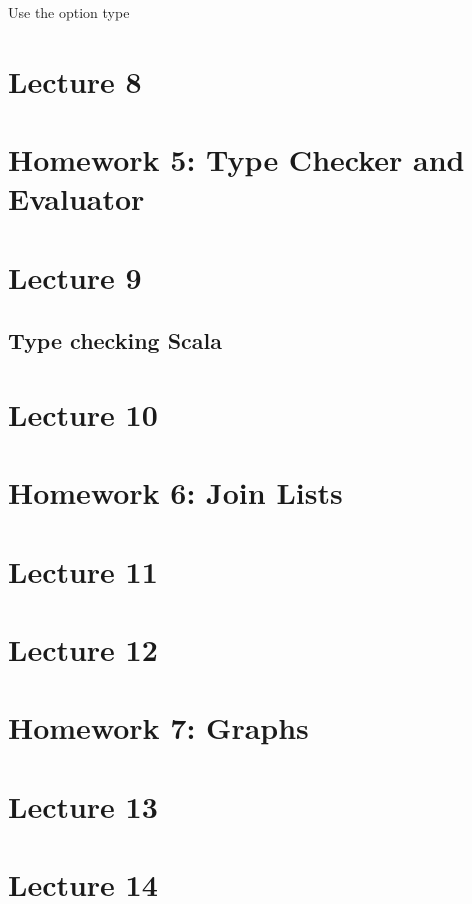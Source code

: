 \documentclass{book}
\begin{document}
Use the option type

\chapter{Lecture 8}

\chapter{Homework 5: Type Checker and Evaluator}

\chapter{Lecture 9}

\section{Type checking Scala}

\chapter{Lecture 10}

\chapter{Homework 6: Join Lists}

\chapter{Lecture 11}

\chapter{Lecture 12}

\chapter{Homework  7: Graphs}

\chapter{Lecture 13}

\chapter{Lecture 14}
\end{document}
